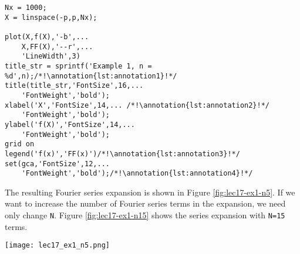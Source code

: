 \begin{lstlisting}[name=lec17-ex1,style=myMatlab]
Nx = 1000;
X = linspace(-p,p,Nx);

plot(X,f(X),'-b',...
    X,FF(X),'--r',...
    'LineWidth',3)
title_str = sprintf('Example 1, n = %d',n);/*!\annotation{lst:annotation1}!*/
title(title_str,'FontSize',16,...
    'FontWeight','bold');
xlabel('X','FontSize',14,... /*!\annotation{lst:annotation2}!*/
    'FontWeight','bold');
ylabel('f(X)','FontSize',14,...
    'FontWeight','bold');
grid on
legend('f(x)','FF(x)')/*!\annotation{lst:annotation3}!*/
set(gca,'FontSize',12,...
    'FontWeight','bold');/*!\annotation{lst:annotation4}!*/
\end{lstlisting} 



 \setcounter{lstannotation}{0}
The resulting Fourier series expansion is shown in Figure \ref{fig:lec17-ex1-n5}. If we want to increase the number of Fourier series terms in the expansion, we need only change \lstinline{N}.  Figure \ref{fig:lec17-ex1-n15} shows the series expansion with \lstinline{N=15} terms.
\begin{marginfigure}
\texttt{[image: lec17\_ex1\_n5.png]}
\caption{Fourier series expansion with \lstinline{N=5}.}
\label{fig:lec17-ex1-n5}
\end{marginfigure}

